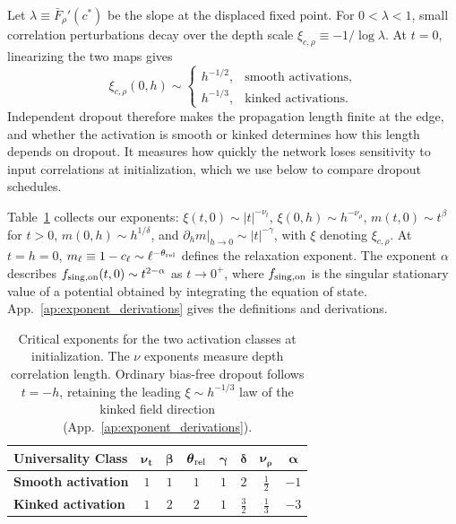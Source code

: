 Let $\lambda\equiv\bar F_\rho'(c^*)$ be the slope at the displaced fixed point. For $0<\lambda<1$, small correlation perturbations decay over the depth scale $\xi_{c,\rho}\equiv-1/\log\lambda$. At $t=0$, linearizing the two maps gives
\begin{equation}
\xi_{c,\rho}(0,h)\sim
\begin{cases}
h^{-1/2}, & \text{smooth activations},\\
h^{-1/3}, & \text{kinked activations}.
\end{cases}
\end{equation}
Independent dropout therefore makes the propagation length finite at the edge, and whether the activation is smooth or kinked determines how this length depends on dropout. It measures how quickly the network loses sensitivity to input correlations at initialization, which we use below to compare dropout schedules.

Table~\ref{tab:critical_exponents} collects our exponents: $\xi(t,0)\sim|t|^{-\nu_t}$, $\xi(0,h)\sim h^{-\nu_\rho}$, $m(t,0)\sim t^\beta$ for $t>0$, $m(0,h)\sim h^{1/\delta}$, and $\left.\partial_hm\right|_{h\to0}\sim|t|^{-\gamma}$, with $\xi$ denoting $\xi_{c,\rho}$. At $t=h=0$, $m_\ell\equiv1-c_\ell\sim\ell^{-\theta_{\rm rel}}$ defines the relaxation exponent. The exponent $\alpha$ describes $f_{\rm sing,on}(t,0)\sim t^{2-\alpha}$ as $t\to0^+$, where $f_{\rm sing,on}$ is the singular stationary value of a potential obtained by integrating the equation of state. App.~\ref{ap:exponent_derivations} gives the definitions and derivations.

\begin{table}[h]
\caption{Critical exponents for the two activation classes at initialization. The $\nu$ exponents measure depth correlation length. Ordinary bias-free \relu{} dropout follows $t=-h$, retaining the leading $\xi\sim h^{-1/3}$ law of the kinked field direction (App.~\ref{ap:exponent_derivations}).}
\label{tab:critical_exponents}
\centering
\small
\setlength{\tabcolsep}{3pt}
\renewcommand{\arraystretch}{1.25}
\begin{tabular}{@{} l ccccccc @{}}
\toprule
\textbf{Universality Class} & $\boldsymbol{\nu_t}$ & $\boldsymbol{\beta}$ & $\boldsymbol{\theta}_{\rm rel}$ & $\boldsymbol{\gamma}$ & $\boldsymbol{\delta}$ & $\boldsymbol{\nu_\rho}$ & $\boldsymbol{\alpha}$ \\
\midrule
\textbf{Smooth activation} & $1$ & $1$ & $1$ & $1$ & $2$ & $\frac{1}{2}$ & $-1$ \\[6pt]
\textbf{Kinked activation} & $1$ & $2$ & $2$ & $1$ & $\frac{3}{2}$ & $\frac{1}{3}$ & $-3$ \\
\bottomrule
\end{tabular}
\end{table}


